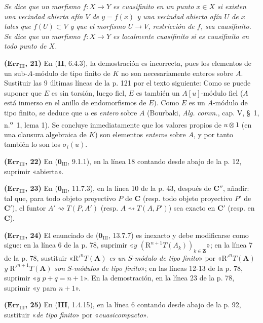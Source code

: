 \emph{Se dice que un morfismo $f:X\to Y$ es cuasifinito en un punto $x\in X$
si existen una vecindad abierta afín $V$ de $y=f(x)$ y una vecindad abierta afín
$U$ de $x$ tales que $f(U)\subset V$ y que el morfismo $U\to V$, restricción de
$f$, sea cuasifinito. Se dice que un morfismo $f:X\to Y$ es localmente
cuasifinito si es cuasifinito en todo punto de $X$.}

\noindent\textbf{($\mathbf{Err}_{\mathrm{III}}$, 21)} En (\textbf{II}, 6.4.3), la
demostración es incorrecta, pues los elementos de un sub-$A$-módulo de tipo
finito de $K$ no son necesariamente enteros sobre $A$. Sustituir las 9 últimas
líneas de la p. 121 por el texto siguiente: Como se puede suponer que $E$ es
sin torsión, luego fiel, $E$ es también un $A[u]$-módulo fiel ($A$ está
inmerso en el anillo de endomorfismos de $E$). Como $E$ es un $A$-módulo de
tipo finito, se deduce que $u$ es \emph{entero} sobre $A$ (Bourbaki,
\emph{Alg. comm.}, cap. V, \S~1, n.\textsuperscript{o}~1, lema 1). Se concluye
inmediatamente que los valores propios de $u\otimes1$ (en una clausura
algebraica de $K$) son elementos \emph{enteros} sobre $A$, y por tanto también
lo son los $\sigma_i(u)$.

\noindent\textbf{($\mathbf{Err}_{\mathrm{III}}$, 22)} En
($\mathbf{0}_{\mathrm{III}}$, 9.1.1), en la línea 18 contando desde abajo de la p. 12,
suprimir «abierta».

\noindent\textbf{($\mathbf{Err}_{\mathrm{III}}$, 23)} En
($\mathbf{0}_{\mathrm{III}}$, 11.7.3), en la línea 10 de la p. 43, después de
$\boldsymbol{C}''$, añadir: tal que, para todo objeto proyectivo $P$ de
$\boldsymbol{C}$ (resp. todo objeto proyectivo $P'$ de $\boldsymbol{C}'$),
el funtor $A'\rightsquigarrow T(P,A')$ (resp.
$A\rightsquigarrow T(A,P')$) sea exacto en $\boldsymbol{C}'$ (resp. en
$\boldsymbol{C}$).

\noindent\textbf{($\mathbf{Err}_{\mathrm{III}}$, 24)} El enunciado de
($\mathbf{0}_{\mathrm{III}}$, 13.7.7) es inexacto y debe modificarse como sigue: en la
línea 6 de la p. 78, suprimir «\emph{y}
$(\mathrm R^{n+1}T(A_k))_{k\in\mathbf Z}$»; en la línea 7 de la p. 78, sustituir
«$\mathrm R'^nT(\mathbf A)$ \emph{es un} $S$-\emph{módulo de tipo finito}» por
«$\mathrm R'^nT(\mathbf A)$ \emph{y} $\mathrm R'^{n+1}T(\mathbf A)$ \emph{son} $S$-\emph{módulos de tipo finito}»;
en las líneas 12-13 de la p. 78, suprimir «\emph{y} $p+q=n+1$». En la demostración,
en la línea 23 de la p. 78, suprimir «y para $n+1$».

\noindent\textbf{($\mathbf{Err}_{\mathrm{III}}$, 25)} En (\textbf{III}, 1.4.15), en
la línea 6 contando desde abajo de la p. 92, sustituir «\emph{de tipo finito}»
por «\emph{cuasicompacto}».

